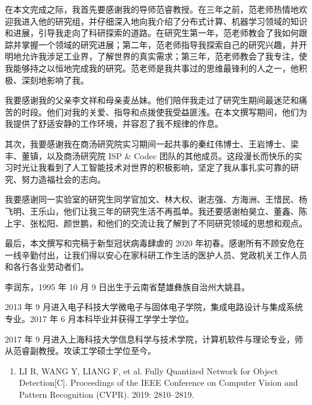 \documentclass[
]{shtthesis}
\begin{document}
\backmatter
\begin{acknowledgement}
在本文完成之际，我首先要感谢我的导师范睿教授。在三年之前，范老师热情地欢迎我进入他的研究组，并仔细深入地向我介绍了分布式计算、机器学习领域的知识和进展，引导我走向了科研探索的道路。在研究生第一年，范老师教会了我如何跟踪并掌握一个领域的研究进展；第二年，范老师指导我探索自己的研究兴趣，并开明地允许我涉足工业界，了解世界的真实需求；第三年，范老师教会了我专注，使我能够持之以恒地完成我的研究。范老师是我共事过的思维最锋利的人之一，他积极、深刻地影响了我。

我要感谢我的父亲李文祥和母亲麦丛妹。他们陪伴我走过了研究生期间最迷茫和痛苦的时段。他们对我的关爱、指导和点拨使我受益匪浅。在本文撰写期间，他们为我提供了舒适安静的工作环境，并容忍了我不规律的作息。

其次，我要感谢我在商汤研究院实习期间一起共事的秦红伟博士、王岩博士、梁丰、董镇，以及商汤研究院 ISP \& Codec 团队的其他成员。这段漫长而快乐的实习时光让我看到了人工智能技术对世界的积极影响，坚定了我从事扎实可靠的研究、努力造福社会的志向。

我要感谢同一实验室的研究生同学官加文、林大权、谢志强、方海洲、王惜民、杨飞明、王乐山，他们让我三年的研究生活不再孤单。我还要感谢柏昊立、董鑫、陈上宇、张松阳、颜世鹏，和他们的交流让我了解到了不同研究领域的思想和观点。

最后，本文撰写和完稿于新型冠状病毒肆虐的 2020 年初春。感谢所有不顾安危在一线辛勤付出，让我们得以安心在家科研工作生活的医护人员、党政机关工作人员和各行各业劳动者们。
\end{acknowledgement}

\begin{resume}
李润东，1995 年 10 月 9 日出生于云南省楚雄彝族自治州大姚县。

2013 年 9 月进入电子科技大学微电子与固体电子学院，集成电路设计与集成系统专业。2017 年 6 月本科毕业并获得工学学士学位。

2017 年 9 月进入上海科技大学信息科学与技术学院，计算机软件与理论专业，师从范睿副教授。攻读工学硕士学位至今。
\end{resume}

\begin{publications}
\begin{enumerate}
  \item LI R, WANG Y, LIANG F, et al. Fully Quantized Network for Object Detection[C]. Proceedings of the IEEE Conference on Computer Vision and Pattern Recognition (CVPR). 2019: 2810--2819.
\end{enumerate}
\end{publications}
\end{document}
